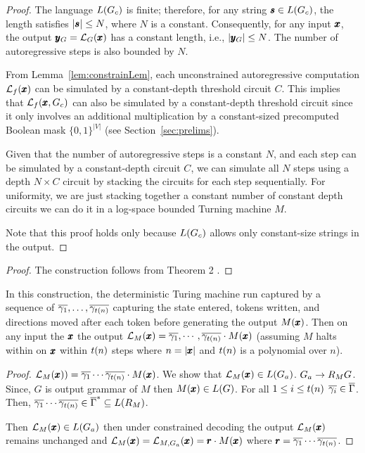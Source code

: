 \compLimitLemma*
\begin{proof}
The language $ L(\regG) $ is finite; therefore, for any string $ \vect{s} \in L(\regG) $, the length satisfies $ |\vect{s}| \leq N $, where $ N $ is a constant. Consequently, for any input $ \vect{x} $, the output $ \vect{y}_G = \llmG{\vect{x}}{G} $ has a constant length, i.e., $ |\vect{y}_{G}| \leq N $. The number of autoregressive steps is also bounded by $ N $.  

From Lemma~\ref{lem:constrainLem}, each unconstrained autoregressive computation $ \llmFormal(\vect{x}) $ can be simulated by a constant-depth threshold circuit $ C $. This implies that $ \llm_f(\vect{x}, \regG) $ can also be simulated by a constant-depth threshold circuit since it only involves an additional multiplication by a constant-sized precomputed Boolean mask $ \{0, 1\}^{|V|} $ (see Section~\ref{sec:prelims}).  

Given that the number of autoregressive steps is a constant $ N $, and each step can be simulated by a constant-depth circuit $ C $, we can simulate all $ N $ steps using a depth $ N \times C $ circuit by stacking the circuits for each step sequentially. For uniformity, we are just stacking together a constant number of constant depth circuits we can do it in a log-space bounded Turning machine $M$. 

Note that this proof holds only because $ L(\regG) $ allows only constant-size strings in the output.  
\end{proof}
\expressivity*
\begin{proof}
The construction follows from Theorem 2 \cite{expressivity1}.
\end{proof}

In this construction, the deterministic Turing machine run captured by a sequence of $\hatConfig{\gamma_1}, \dots, \hatConfig{\gamma_{t(n)}}$ capturing the state entered, tokens written, and directions moved after each token before generating the output $M(\vect{x})$. Then on any input the $\vect{x}$ the output $\llm_{M}(\vect{x}) = \hatConfig{\gamma_1}, \cdots, \hatConfig{\gamma_{t(n)}}\cdot M(\vect{x})$ (assuming $M$ halts within on $\vect{x}$ within $\runtime{n}$ steps where $n = |\vect{x}|$ and $\runtime{n}$ is a polynomial over $n$).

\expressConstrain*
\begin{proof}
$\llm{}_{M}(\vect{x})) = \hatConfig{\gamma_1}\cdots\hatConfig{\gamma_{\runtime{n}}}\cdot M(\vect{x})$. We show that $\llm{}_{M}(\vect{x}) \in L(\augG)$. 
$\augG \to \rGM G$. Since, $G$ is output grammar of $M$ then $M(\vect{x}) \in \lang{G}$. For all $1 \leq i \leq \runtime{n}$ $\hatConfig{\gamma_{i}} \in \hatConfig{\Gamma}$. Then, $\hatConfig{\gamma_1}\cdots\hatConfig{\gamma_{\runtime{n}}} \in \hatConfig{\Gamma}^{*} \subseteq L(\rGM)$.

Then $\llm{}_{M}(\vect{x}) \in \lang{\augG}$ then under constrained decoding the output $\llm{}_{M}(\vect{x})$ remains unchanged and $\llm{}_{M}(\vect{x}) = \llmMG{\vect{x}}{\augG} = \vect{r} \cdot M(\vect{x})$ where $\vect{r} = \hatConfig{\gamma_1}\cdots\hatConfig{\gamma_{\runtime{n}}}$.
\end{proof}